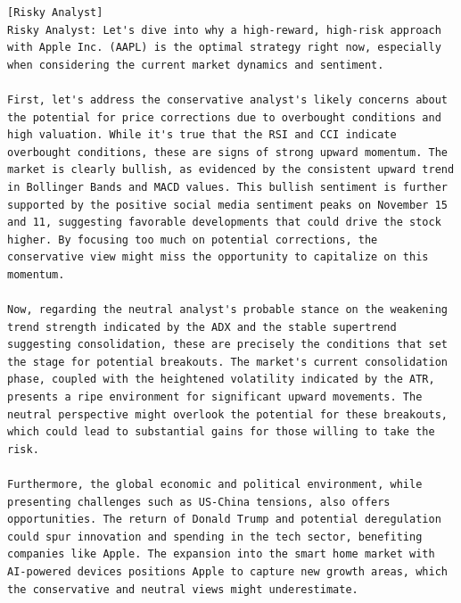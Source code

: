 \begin{tcolorbox}[
    breakable,
    enhanced,
    colback=lightpurple!40!white,
    colframe=violet!25!gray,
    coltitle=black,
    boxrule=0.5pt,
    arc=0.5mm,
    top=2mm, bottom=2mm, left=2mm, right=2mm,
    fonttitle=\usefont{T1}{ppl}{b}{n},
    title=\model: Risk Management Team Aggressive Agent -- Apple (AAPL),
]
\footnotesize
\begin{lstlisting}[style=agentbase]
[Risky Analyst]
Risky Analyst: Let's dive into why a high-reward, high-risk approach with Apple Inc. (AAPL) is the optimal strategy right now, especially when considering the current market dynamics and sentiment.

First, let's address the conservative analyst's likely concerns about the potential for price corrections due to overbought conditions and high valuation. While it's true that the RSI and CCI indicate overbought conditions, these are signs of strong upward momentum. The market is clearly bullish, as evidenced by the consistent upward trend in Bollinger Bands and MACD values. This bullish sentiment is further supported by the positive social media sentiment peaks on November 15 and 11, suggesting favorable developments that could drive the stock higher. By focusing too much on potential corrections, the conservative view might miss the opportunity to capitalize on this momentum.

Now, regarding the neutral analyst's probable stance on the weakening trend strength indicated by the ADX and the stable supertrend suggesting consolidation, these are precisely the conditions that set the stage for potential breakouts. The market's current consolidation phase, coupled with the heightened volatility indicated by the ATR, presents a ripe environment for significant upward movements. The neutral perspective might overlook the potential for these breakouts, which could lead to substantial gains for those willing to take the risk.

Furthermore, the global economic and political environment, while presenting challenges such as US-China tensions, also offers opportunities. The return of Donald Trump and potential deregulation could spur innovation and spending in the tech sector, benefiting companies like Apple. The expansion into the smart home market with AI-powered devices positions Apple to capture new growth areas, which the conservative and neutral views might underestimate.


\end{lstlisting}
\end{tcolorbox}
